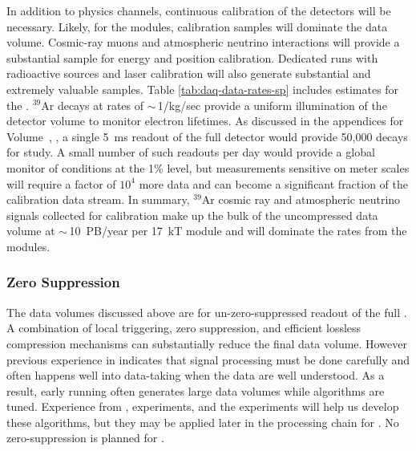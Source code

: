 In addition to physics channels, continuous calibration of the detectors will be necessary.  Likely, for the  modules, calibration samples will  dominate the data volume. Cosmic-ray muons and atmospheric neutrino interactions will provide a substantial sample for energy and position calibration.  Dedicated runs with radioactive sources and laser calibration will also generate substantial and extremely valuable samples. Table \ref{tab:daq-data-rates-sp} includes estimates for the %
. 
$^{39}$Ar decays at rates of $\sim\,$1/kg/sec provide a uniform illumination of the detector volume to monitor electron lifetimes. As discussed in the appendices for %
Volume~\volnumberphysics{}, \voltitlephysics{},  a single \SI{5}{ms} readout of the full detector would provide 50,000 decays for study.  A small number of such readouts per day would provide a global monitor of conditions at the 1\% level, but measurements sensitive on meter scales will require a factor of $10^4$ more data and can become a significant fraction of the calibration data stream. In summary, $^{39}$Ar cosmic ray and atmospheric neutrino signals collected for calibration make up the bulk of the uncompressed  data volume at $\sim\,$\SI{10}{PB/year} per \SI{17}{kT} module and will dominate the rates from the  modules.  


\subsubsection{Zero Suppression}

The data volumes discussed above are for un-zero-suppressed readout of the full . A combination of local triggering, zero suppression, and  efficient lossless compression mechanisms can substantially reduce the final data volume. However previous experience in  indicates that signal processing must be done carefully and often happens well into data-taking when the data are well understood.  As a result, early running often generates large data volumes while algorithms are tuned. 
Experience from  ,  experiments, and the  experiments will help us develop these algorithms, but they may be applied later in the processing chain for .  No zero-suppression is planned for .



